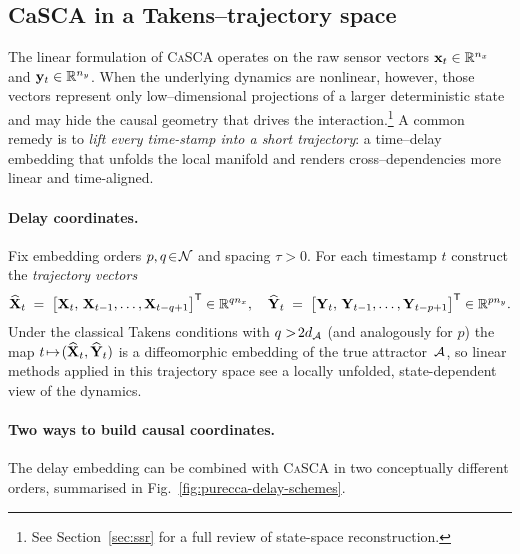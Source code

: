 \documentclass[14pt]{extarticle}
\begin{document}
	\subsection{CaSCA in a Takens–trajectory space}\label{subsec:purecca-traj}
	
	The linear formulation of \textsc{CaSCA} operates on the raw sensor
	vectors $\mathbf{x}_t\in\mathbb{R}^{n_x}$ and $\mathbf{y}_t\in\mathbb{R}^{n_y}$.  
	When the underlying dynamics are nonlinear, however, those vectors
	represent only low–dimensional projections of a larger deterministic
	state and may hide the causal geometry that drives the
	interaction.\footnote{See Section~\ref{sec:ssr} for a full review of
		state-space reconstruction.}  
	A common remedy is to \emph{lift every time-stamp into a
		short trajectory}: a time–delay embedding that unfolds the local
	manifold and renders cross–dependencies more linear and
	time-aligned.
	
	\paragraph{Delay coordinates.}
	Fix embedding orders $p,q\!\in\!\mathcal{N}$ and spacing $\tau>0$.  
	For each timestamp $t$ construct the
	\emph{trajectory vectors}
	\[
	\widehat{\mathbf{X}}_t \;=\;
	\bigl[\mathbf{X}_t,\,\mathbf{X}_{t-1},\dots,\mathbf{X}_{t-q+1}\bigr]^{\mathsf{T}}\in\mathbb{R}^{q n_x},
	\quad
	\widehat{\mathbf{Y}}_t \;=\;
	\bigl[\mathbf{Y}_t,\,\mathbf{Y}_{t-1},\dots,\mathbf{Y}_{t-p+1}\bigr]^{\mathsf{T}}\in\mathbb{R}^{p n_y}.
	\]
	Under the classical Takens conditions with $q>\!2d_{\mathcal{A}}$ (and
	analogously for $p$) the map
	$t\!\mapsto\!(\widehat{\mathbf{X}}_t,\widehat{\mathbf{Y}}_t)$ is a diffeomorphic
	embedding of the true attractor~$\mathcal{A}$, so linear methods applied in this
	trajectory space see a locally unfolded, \mbox{state-dependent} view of
	the dynamics.
	
	\paragraph{Two ways to build causal coordinates.}
	The delay embedding can be combined with \textsc{CaSCA} in two
	conceptually different orders, summarised in
	Fig.~\ref{fig:purecca-delay-schemes}.
	
\end{document}
